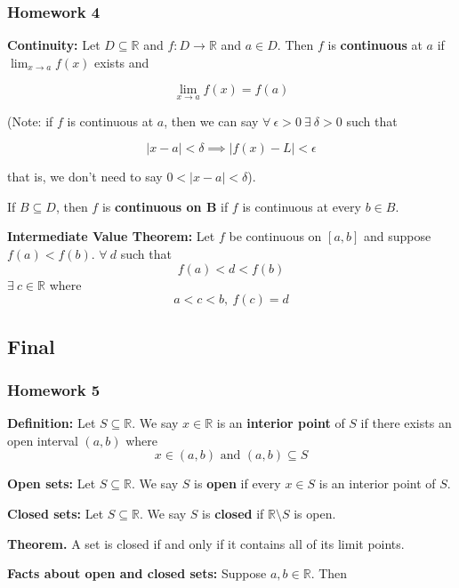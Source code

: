\subsubsection{Homework 4}

\textbf{Continuity:} Let \(D \subseteq \mathbb{R}\) and \(f:D \to \mathbb{R}\) and \(a \in D\). Then \(f\) is \textbf{continuous} at \(a\) if \(\lim_{x \to a} f(x)\) exists and 

\[
\lim_{x \to a} f(x) = f(a)
\]

(Note: if \(f\) is continuous at \(a\), then we can say \(\forall \ \epsilon > 0 \ \exists \ \delta > 0 \) such that

\[
|x - a| < \delta \implies |f(x) - L| < \epsilon
\]

that is, we don't need to say \(0 < |x - a| < \delta\)).

If \(B \subseteq D\), then \(f\) is \textbf{continuous on B} if \(f\) is continuous at every \(b \in B\).

\textbf{Intermediate Value Theorem:} Let \(f\) be continuous on \([a, b]\) and suppose \(f(a) < f(b)\). \(\forall \ d\) such that \[f(a) < d < f(b)\]  \(\exists \ c \in \mathbb{R}\) where \[a < c < b, \ f(c) = d\]

\pagebreak

\subsection{Final}

\subsubsection{Homework 5}

\textbf{Definition:} Let \(S \subseteq \mathbb{R}\). We say \(x \in \mathbb{R}\) is an \textbf{interior point} of \(S\) if there exists an open interval \((a, b)\) where \[x \in (a, b) \text{ and } (a, b) \subseteq S\]

\textbf{Open sets:} Let \(S \subseteq \mathbb{R}\). We say \(S\) is \textbf{open} if every \(x \in S\) is an interior point of \(S\).

\textbf{Closed sets:} Let \(S \subseteq \mathbb{R}\). We say \(S\) is \textbf{closed} if \(\mathbb{R} \setminus S\) is open.

\textbf{Theorem.} A set is closed if and only if it contains all of its limit points.

\textbf{Facts about open and closed sets:} Suppose \(a, b \in \mathbb{R}\). Then


